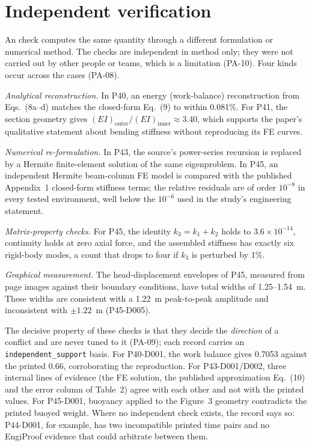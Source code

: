 \section{Independent verification}
\label{sec:independent}

An  check computes the same quantity through a different formulation or numerical method. The checks are independent in method only; they were not carried out by other people or teams, which is a limitation (PA-10). Four kinds occur across the cases (PA-08).

\emph{Analytical reconstruction.} In P40, an energy (work-balance) reconstruction from Eqs.~(8a--d) matches the closed-form Eq.~(9) to within 0.081\%. For P41, the section geometry gives $(EI)_{\text{outer}}/(EI)_{\text{inner}} \approx 3.40$, which supports the paper's qualitative statement about bending stiffness without reproducing its FE curves.

\emph{Numerical re-formulation.} In P43, the source's power-series recursion is replaced by a Hermite finite-element solution of the same eigenproblem. In P45, an independent Hermite beam-column FE model is compared with the published Appendix~1 closed-form stiffness terms; the relative residuals are of order $10^{-8}$ in every tested environment, well below the $10^{-6}$ used in the study's engineering statement.

\emph{Matrix-property checks.} For P45, the identity $k_3=k_1+k_2$ holds to $3.6\times10^{-14}$, continuity holds at zero axial force, and the assembled stiffness has exactly six rigid-body modes, a count that drops to four if $k_3$ is perturbed by 1\%.

\emph{Graphical measurement.} The head-displacement envelopes of P45, measured from page images against their boundary conditions, have total widths of 1.25--1.54~m. These widths are consistent with a 1.22~m peak-to-peak amplitude and inconsistent with $\pm1.22$~m (P45-D005).

The decisive property of these checks is that they decide the \emph{direction} of a conflict and are never tuned to it (PA-09); each record carries an \texttt{independent\_support} basis. For P40-D001, the work balance gives 0.7053 against the printed 0.66, corroborating the reproduction. For P43-D001/D002, three internal lines of evidence (the FE solution, the published approximation Eq.~(10) and the error column of Table~2) agree with each other and not with the printed values. For P45-D001, buoyancy applied to the Figure~3 geometry contradicts the printed buoyed weight. Where no independent check exists, the record says so: P44-D001, for example, has two incompatible printed time pairs and no EngiProof evidence that could arbitrate between them.
